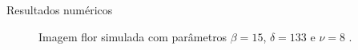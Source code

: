 \documentclass[10pt]{beamer}
\begin{document}
\begin{frame}{Resultados numéricos}
\begin{figure}[hbt]
	\caption{Imagem flor simulada com parâmetros $\beta = 15$, $\delta = 133$ e $\nu = 8$ .}
\endminipage\hfill
{}

\end{figure}
\end{frame}
\end{document}

